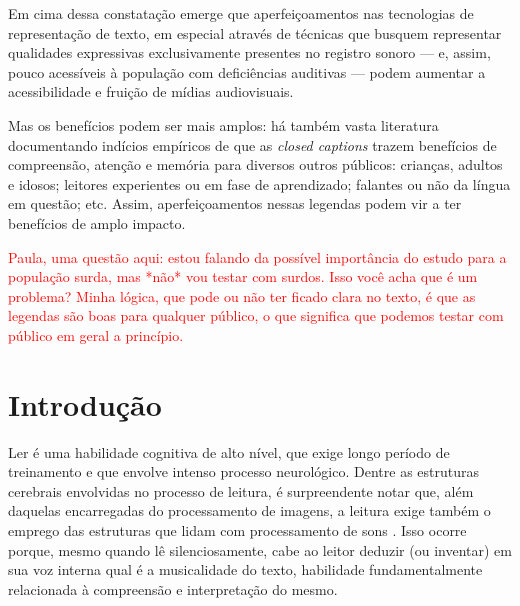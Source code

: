 \documentclass[a4paper,11pt,titlepage,singlespacing]{article}
\newcommand\todo[1]{\textcolor{red}{#1}}
\begin{document}
Em cima dessa constatação emerge que aperfeiçoamentos nas tecnologias de representação de texto, em especial através de técnicas que busquem representar qualidades expressivas exclusivamente presentes no registro sonoro — e, assim, pouco acessíveis à população com deficiências auditivas — podem aumentar a acessibilidade e fruição de mídias audiovisuais.

Mas os benefícios podem ser mais amplos: há também vasta literatura \cite{fiske_video_2015} documentando indícios empíricos de que as \textit{closed captions} trazem benefícios de compreensão, atenção e memória para diversos outros públicos: crianças, adultos e idosos; leitores experientes ou em fase de aprendizado; falantes ou não da língua em questão; etc. Assim, aperfeiçoamentos nessas legendas podem vir a ter benefícios de amplo impacto.

\todo{Paula, uma questão aqui: estou falando da possível importância do estudo para a população surda, mas *não* vou testar com surdos. Isso você acha que é um problema? Minha lógica, que pode ou não ter ficado clara no texto, é que as legendas são boas para qualquer público, o que significa que podemos testar com público em geral a princípio. }


\newpage


\thispagestyle{empty}
\newpage
{}


\renewcommand{\contentsname}{Sumário}
\tableofcontents

\newpage

\section{Introdução}

\noindent Ler é uma habilidade cognitiva de alto nível, que exige longo período de treinamento e que envolve intenso processo neurológico. Dentre as estruturas cerebrais envolvidas no processo de leitura, é surpreendente notar que, além daquelas encarregadas do processamento de imagens, a leitura exige também o emprego das estruturas que lidam com processamento de sons \cite[cap.7]{seidenberg2017}. Isso ocorre porque, mesmo quando lê silenciosamente, cabe ao leitor deduzir (ou inventar) em sua voz interna qual é a musicalidade do texto, habilidade fundamentalmente relacionada à compreensão e interpretação do mesmo.
\end{document}
